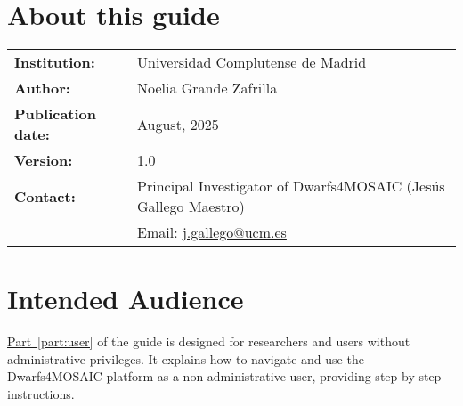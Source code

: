 



\newcommand{\project}{\textsf{Dwarfs4MOSAIC}\xspace}
\newcommand{\prjInstitution}{Universidad Complutense de Madrid}
\newcommand{\prjAuthor}{Noelia Grande Zafrilla}
\newcommand{\prjPubDate}{August, 2025} %
\newcommand{\prjVersion}{1.0}
\newcommand{\prjContact}{Principal Investigator of Dwarfs4MOSAIC (Jesús Gallego Maestro)}
\newcommand{\prjMail}{j.gallego@ucm.es}



	
	\pagestyle{empty}   %
	
	
	
	\setlength{\parskip}{1em}    %
	\setlength{\parindent}{0pt}  %
	
	\section*{About this guide}
	
	
	\begin{flushleft}
		\begin{tabular}{ll}
			\textbf{Institution:} & \prjInstitution \\
			\textbf{Author:} & \prjAuthor \\
			\textbf{Publication date:} & \prjPubDate \\
			\textbf{Version:} & 1.0 \\
			\textbf{Contact:} & \prjContact \\
			& Email: \href{mailto:\prjMail}{\prjMail}
		\end{tabular}
	\end{flushleft}
	
	\vspace{2cm}
	
	\section*{Intended Audience}
	
	\hyperref[part:user]{Part~\ref*{part:user}} of the guide is designed for researchers and users without administrative privileges. It explains how to navigate and use the \project platform as a non-administrative user, providing step-by-step instructions.
	
